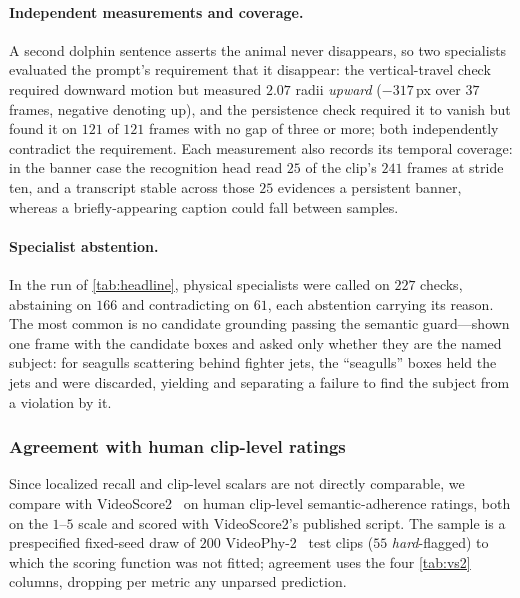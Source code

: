 \paragraph{Independent measurements and coverage.} A second dolphin sentence asserts the animal never
disappears, so two specialists evaluated the prompt's requirement that it disappear: the
vertical-travel check required downward motion but measured $2.07$ radii \emph{upward} ($-317$\,px
over $37$ frames, negative denoting up), and the persistence check required it to vanish but found it
on $121$ of $121$ frames with no gap of three or more; both independently contradict the
requirement. Each measurement also records its temporal coverage: in the banner case the recognition
head read $25$ of the clip's $241$ frames at stride ten, and a transcript stable across those $25$
evidences a persistent banner, whereas a briefly-appearing caption could fall between samples.

\paragraph{Specialist abstention.} In the run of \cref{tab:headline}, physical specialists were
called on $227$ checks, abstaining on $166$ and contradicting on $61$, each abstention carrying its
reason. The most common is no candidate grounding passing the semantic guard---shown one frame with
the candidate boxes and asked only whether they are the named subject: for seagulls scattering
behind fighter jets, the ``seagulls'' boxes held the jets and were discarded, yielding \unknownv{}
and separating a failure to find the subject from a violation by it.
\subsubsection{Agreement with human clip-level ratings}
\label{sec:vs2}
Since localized recall and clip-level scalars are not directly comparable, we compare \PhyReAct{} with VideoScore2~\cite{videoscore2_2025} on human clip-level semantic-adherence ratings, both on the $1$--$5$ scale and scored with VideoScore2's published script. The sample is a prespecified fixed-seed draw of $200$ VideoPhy-2~\cite{videophy2_2025} test clips ($55$ \emph{hard}-flagged) to which the scoring function was not fitted; agreement uses the four \cref{tab:vs2} columns, dropping per metric any unparsed prediction.

